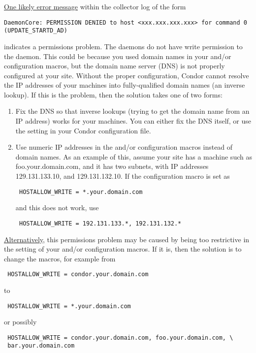 \underline{One likely error message} within the collector log of the form
\footnotesize
\begin{verbatim}
DaemonCore: PERMISSION DENIED to host <xxx.xxx.xxx.xxx> for command 0 (UPDATE_STARTD_AD)
\end{verbatim}
\normalsize
indicates a permissions problem.
The  daemons do not have write permission to the
 daemon.
This could be because
you used domain names in your  and/or
 configuration macros,
but the domain name server (DNS) is not properly configured at your site.
Without the proper configuration, Condor cannot resolve
the IP addresses of your machines
into fully-qualified domain names (an inverse lookup).
If this is the problem, then the solution takes one of two forms:
\begin{enumerate}
\item Fix the DNS so that inverse lookups (trying to get the domain name
   from an IP address) works for your machines.  You can
   either fix the DNS itself,
   or use the  setting in your Condor
         configuration file.
\item Use numeric IP addresses in the  and/or
    configuration macros
   instead of domain names.
   As an example of this, assume your site has a machine such as
   foo.your.domain.com, and it has two subnets, with IP addresses
   129.131.133.10, and 129.131.132.10.
   If the configuration macro is set as 

\begin{verbatim}
 HOSTALLOW_WRITE = *.your.domain.com
\end{verbatim}

   and this does not work, use

\begin{verbatim}
 HOSTALLOW_WRITE = 192.131.133.*, 192.131.132.*
\end{verbatim}
\end{enumerate}

\underline{Alternatively}, this permissions problem
may be caused by being too restrictive in the setting of
your  and/or
 configuration macros.
If it is, then the solution is to change the macros,
for example from
\begin{verbatim}
 HOSTALLOW_WRITE = condor.your.domain.com
\end{verbatim}
to
\begin{verbatim}
 HOSTALLOW_WRITE = *.your.domain.com
\end{verbatim}
or possibly
\footnotesize
\begin{verbatim}
 HOSTALLOW_WRITE = condor.your.domain.com, foo.your.domain.com, \
 bar.your.domain.com 
\end{verbatim}
\normalsize


